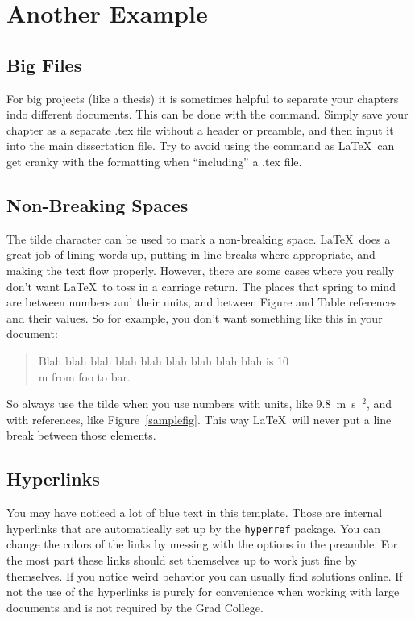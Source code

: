 \chapter{Another Example} 
\thispagestyle{fancy} %

\section{Big Files}
For big projects (like a thesis) it is sometimes helpful to separate your chapters indo different documents. This
can be done with the \verb== command. Simply save your chapter as a separate .tex file without a header or
preamble, and then input it into the main dissertation file. Try to avoid using the \verb== command as \LaTeX\
can get cranky with the formatting when ``including'' a .tex file.

\section{Non-Breaking Spaces}
The tilde character can be used to mark a non-breaking space. \LaTeX\ does a great job of lining words up, putting
in line breaks where appropriate, and making the text flow properly. However, there are some cases where you really
don't want \LaTeX\ to toss in a carriage return. The places that spring to mind are between numbers and their units,
and between Figure and Table references and their values. So for example, you don't want something like this in your
document:

\begin{quote}
	Blah blah blah blah blah blah blah blah blah is 10\\
	m from foo to bar.
\end{quote}

So always use the tilde when you use numbers with units, like 9.8~m~s$^{-2}$, and with references, like Figure~\ref{samplefig}.
This way \LaTeX\ will never put a line break between those elements.


\section{Hyperlinks}
You may have noticed a lot of blue text in this template. Those are internal hyperlinks that are automatically set up by 
the \texttt{hyperref} package. You can change the colors of the links by messing with the options in the preamble. For the
most part these links should set themselves up to work just fine by themselves. If you notice weird behavior you can usually
find solutions online. If not the use of the hyperlinks is purely for convenience when working with large documents and is not
required by the Grad College.

